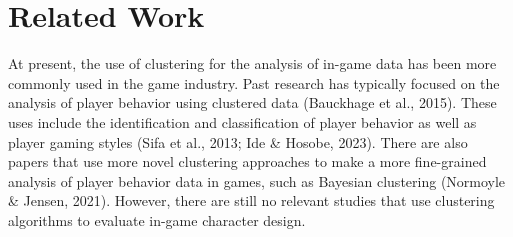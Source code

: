 \section{Related Work}
At present, the use of clustering for the analysis of in-game data has been more commonly used in the game industry. Past research has typically focused on the analysis of player behavior using clustered data (Bauckhage et al., 2015). These uses include the identification and classification of player behavior as well as player gaming styles (Sifa et al., 2013; Ide \& Hosobe, 2023). There are also papers that use more novel clustering approaches to make a more fine-grained analysis of player behavior data in games, such as Bayesian clustering (Normoyle \& Jensen, 2021). However, there are still no relevant studies that use clustering algorithms to evaluate in-game character design.